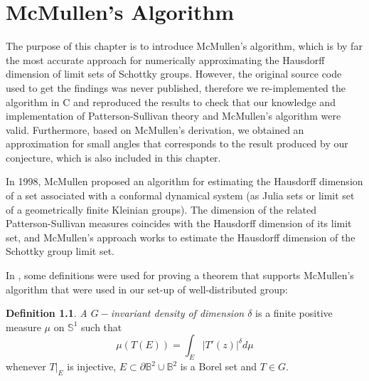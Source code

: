 \documentclass[12pt,oneside]{sfsuthesis}
\theoremstyle{plain} %
\theoremstyle{definition}  %
\newtheorem{definition}{Definition}[chapter]
\theoremstyle{remark}  %
\theoremstyle{plain}
\begin{document}
{\chapter{McMullen's Algorithm}

The purpose of this chapter is to introduce McMullen's algorithm, which is by far the most accurate approach for numerically approximating the Hausdorff dimension of limit sets of Schottky groups. However, the original source code used to get the findings was never published\cite{mcmullen1998hausdorff}, therefore we re-implemented the algorithm in C and reproduced the results to check that our knowledge and implementation of Patterson-Sullivan theory and McMullen's algorithm were valid. Furthermore, based on McMullen's derivation, we obtained an approximation for small angles that corresponds to the result produced by our conjecture, which is also included in this chapter.

In 1998, McMullen\cite{mcmullen1998hausdorff} proposed an algorithm for estimating the Hausdorff dimension of a set associated with a conformal dynamical system (as Julia sets or limit set of a geometrically finite Kleinian groups). The dimension of the related Patterson-Sullivan measures coincides with the Hausdorff dimension of its limit set, and McMullen's approach works to estimate the Hausdorff dimension of the Schottky group limit set.

In \cite{mcmullen1998hausdorff}, some definitions were used for proving a theorem that supports McMullen's algorithm that were used in our set-up of well-distributed group:
\begin{definition}
\textit{A $G-$invariant density of dimension $\delta$} is a finite positive measure $\mu$ on $\mathbb{S}^1$ such that
$$
\mu\left(T\left(E\right)\right)=\int_{E}\vert T'(z) \vert^\delta d\mu
$$
whenever $T\vert_{E}$ is injective, $E\subset \partial \mathbb{B}^2\cup \mathbb{B}^2$ is a Borel set and $T\in G$.
\end{definition}

}
\end{document}
